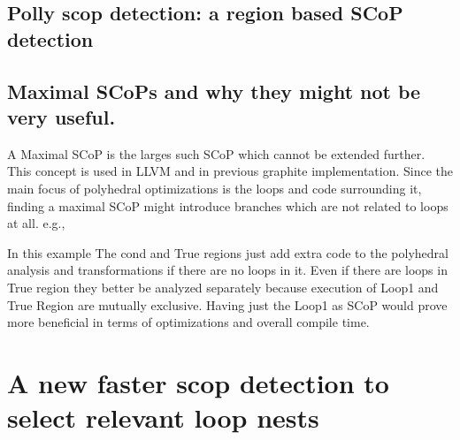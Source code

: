 \documentclass{sigplanconf}
\begin{document}
\subsection{Polly scop detection: a region based SCoP detection}

\subsection{Maximal SCoPs and why they might not be very useful.}
A Maximal SCoP is the larges such SCoP which cannot be extended further. This concept is used
in LLVM 
and in previous graphite implementation.
Since the main focus of
polyhedral optimizations is the loops and code surrounding it, finding a maximal SCoP might introduce branches
which are not related to loops at all. e.g.,

\begin{comment}
Scop
Cond
|
|--True Region
|
|--False Region
|       | Loop1
|       |
\end{comment}

In this example The cond and True regions just add extra code to the polyhedral analysis and transformations if there
are no loops in it. Even if there are loops in True region they better be analyzed separately because
execution of Loop1 and True Region are mutually exclusive.
Having just the Loop1 as SCoP would prove more beneficial in terms of optimizations and overall compile time.

\section{A new faster scop detection to select relevant loop nests}

\end{document}
